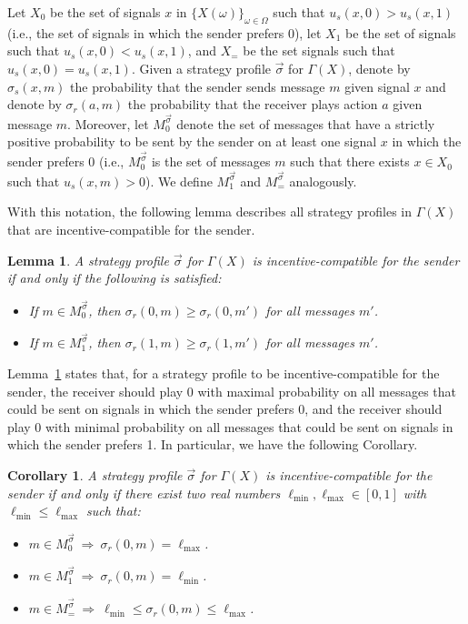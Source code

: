 \documentclass[submission,copyright,creativecommons]{eptcs}
\newtheorem{lemma}{Lemma}
\newtheorem{corollary}{Corollary}
\begin{document}
Let $X_0$ be the set of signals $x$ in $\{X(\omega)\}_{\omega \in \Omega}$ such that 
$u_s(x, 0) > u_s(x, 1)$ (i.e., the set of signals in which the sender prefers $0$), let $X_1$ be the set of signals such that 
$u_s(x, 0) < u_s(x, 1)$, and $X_=$ be the set signals such that 
$u_s(x, 0) = u_s(x, 1)$. 
Given a strategy profile $\vec{\sigma}$ for $\Gamma(X)$, denote by $\sigma_s(x, m)$ the probability that the sender sends message $m$ given signal $x$ and denote by $\sigma_r(a, m)$ the probability that the receiver plays action $a$ given message $m$. Moreover, let $M_0^{\vec{\sigma}}$ denote the set of messages that have a strictly positive probability to be sent by the sender on at least one signal $x$ in which the sender prefers 0 (i.e., $M_0^{\vec{\sigma}}$ is the set of messages $m$ such that there exists $x \in X_0$ such that $u_s(x, m) > 0$). We define $M_1^{\vec{\sigma}}$ and $M_=^{\vec{\sigma}}$ analogously. 


With this notation, the following lemma describes all strategy profiles in $\Gamma(X)$ that are incentive-compatible for the sender.

\begin{lemma}\label{lemma:char}
A strategy profile $\vec{\sigma}$ for $\Gamma(X)$ is incentive-compatible for the sender if and only if the following is satisfied:
\begin{itemize}
\item [(a)] If $m \in M^{\vec{\sigma}}_0$, then $\sigma_r(0, m) \ge \sigma_r(0, m')$ for all messages $m'$.
\item [(b)] If $m \in M^{\vec{\sigma}}_1$, then $\sigma_r(1, m) \ge \sigma_r(1, m')$ for all messages $m'$.
\end{itemize}
\end{lemma}

Lemma~\ref{lemma:char} states that, for a strategy profile to be incentive-compatible for the sender, the receiver should play $0$ with maximal probability on all messages that could be sent on signals in which the sender prefers 0, and the receiver should play $0$ with minimal probability on all messages that could be sent on signals in which the sender prefers 1. In particular, we have the following Corollary.

\begin{corollary}\label{col:char}
A strategy profile $\vec{\sigma}$ for $\Gamma(X)$ is incentive-compatible for the sender if and only if there exist two real numbers $\ell_{\min},\ell_{\max} \in [0,1]$ with $\ell_{\min} \le \ell_{\max}$ such that:
\begin{itemize}
\item [(a)]  $m \in M^{\vec{\sigma}}_0 \ \Longrightarrow \ \sigma_r(0, m) = \ell_{\max}$.
\item [(b)] $m \in M^{\vec{\sigma}}_1 \ \Longrightarrow \ \sigma_r(0, m) = \ell_{\min}$.
\item [(c)] $m \in M^{\vec{\sigma}}_= \ \Longrightarrow \ \ell_{\min} \le \sigma_r(0, m) \le \ell_{\max}$.
\end{itemize}
\end{corollary}
\end{document}
